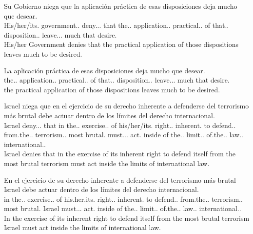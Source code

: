 \begin{exe}
  \ex\label{ex:neg1}
    \begin{xlist}
      \item{\gll Su Gobierno niega que la aplicación práctica de esas disposiciones deja mucho que desear.\\ His/her/its.\Sg{} government.\M.\Sg{} deny.\Prs.\Ind.\Tsg{} that the.\F.\Sg{} application.\F.\Sg{} practical.\F.\Sg{} of that.\F.\Pl{} disposition.\F.\Pl{} leave.\Prs.\Ind.\Tsg{} much that desire.\Inf{} \\\glt His/her Government denies that the practical application of those dispositions leaves much to be desired.}
      \item{\gll La aplicación práctica de esas disposiciones deja mucho que desear.\\ the.\F.\Sg{} application.\F.\Sg{} practical.\F.\Sg{} of that.\F.\Pl{} disposition.\F.\Pl{} leave.\Prs.\Ind.\Tsg{} much that desire.\Inf{}\\\glt the practical application of those dispositions leaves much to be desired.} \label{ex:hypneg1}
    \end{xlist}
  \ex\label{ex:neg2}
    \begin{xlist}
      \item{\gll Israel niega que en el ejercicio de su derecho inherente a defenderse del terrorismo más brutal debe actuar dentro de los límites del derecho internacional.\\ Israel deny.\Prs.\Ind.\Tsg{} that in the.\M.\Sg{} exercise.\M.\Sg{} of his/her/its.\Sg{} right.\M.\Sg{} inherent.\Sg{} to defend.\Inf.\Refl{} from.the.\M.\Sg{} terrorism.\M.\Sg{} most brutal.\Sg{} must.\Prs.\Ind.\Tsg{} act.\Inf{} inside of the.\M.\Pl{} limit.\M.\Pl{} of.the.\M.\Pl{} law.\M.\Sg{} international.\M.\Sg{} \\\glt Israel denies that in the exercise of its inherent right to defend itself from the most brutal terrorism must act inside the limits of international law.}
      \item{\gll En el ejercicio de su derecho inherente a defenderse del terrorismo más brutal Israel debe actuar dentro de los límites del derecho internacional.\\ in the.\M.\Sg{} exercise.\M.\Sg{} of his.her.its.\Sg{} right.\M.\Sg{} inherent.\Sg{} to  defend.\Inf.\Refl{} from.the.\M.\Sg{} terrorism.\M.\Sg{} most brutal.\Sg{} Israel must.\Prs.\Ind.\Tsg{} act.\Inf{} inside of the.\M.\Pl{} limit.\M.\Pl{} of.the.\M.\Pl{} law.\M.\Sg{} international.\M.\Sg{} \\\glt In the exercise of its inherent right to defend itself from the most brutal terrorism Israel must act inside the limits of international law.} \label{ex:hypneg2}
    \end{xlist}
\end{exe}

